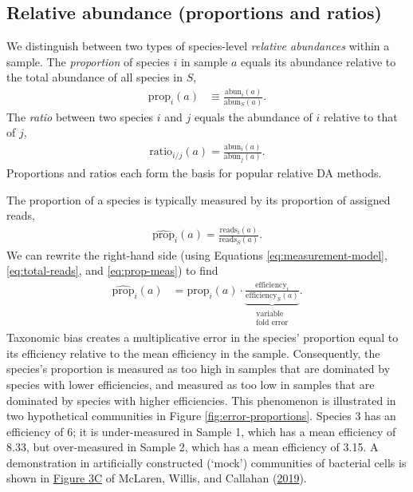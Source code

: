 \documentclass[
]{article}
\begin{document}
\hypertarget{relative-abundance}{%
\subsection{Relative abundance (proportions and ratios)}\label{relative-abundance}}

We distinguish between two types of species-level \emph{relative abundances} within a sample.
The \emph{proportion} of species \(i\) in sample \(a\) equals its abundance relative to the total abundance of all species in \(S\),
\begin{align}
  \label{eq:prop}
  \text{prop}_{i}(a) 
    &\equiv \frac{\text{abun}_i(a)}{\text{abun}_S(a)}.
\end{align}
The \emph{ratio} between two species \(i\) and \(j\) equals the abundance of \(i\) relative to that of \(j\),
\begin{align}
  \label{eq:ratio}
  \text{ratio}_{i/j}(a) = \frac{\text{abun}_i(a)}{\text{abun}_j(a)}.
\end{align}
Proportions and ratios each form the basis for popular relative DA methods.

The proportion of a species is typically measured by its proportion of assigned reads,
\begin{align}
  \label{eq:prop-meas}
  \widehat{\text{prop}}_{i}(a) = \frac{\text{reads}_i(a)}{\text{reads}_S(a)}.
\end{align}
We can rewrite the right-hand side (using Equations \eqref{eq:measurement-model}, \eqref{eq:total-reads}, and \eqref{eq:prop-meas}) to find
\begin{align}
  \label{eq:prop-error}
  \widehat{\text{prop}}_{i}(a)
  &= \text{prop}_{i}(a) \cdot \underbrace{\frac{\text{efficiency}_{i}}{\text{efficiency}_S(a)}}_{\substack{\text{variable} \\ \text{fold error}}}.
\end{align}
Taxonomic bias creates a multiplicative error in the species' proportion equal to its efficiency relative to the mean efficiency in the sample.
Consequently, the species's proportion is measured as too high in samples that are dominated by species with lower efficiencies, and measured as too low in samples that are dominated by species with higher efficiencies.
This phenomenon is illustrated in two hypothetical communities in Figure \ref{fig:error-proportions}.
Species 3 has an efficiency of 6; it is under-measured in Sample 1, which has a mean efficiency of 8.33, but over-measured in Sample 2, which has a mean efficiency of 3.15.
A demonstration in artificially constructed (`mock') communities of bacterial cells is shown in \href{https://doi.org/10.7554/eLife.46923.004}{Figure 3C} of McLaren, Willis, and Callahan (\protect\hyperlink{ref-mclaren2019cons}{2019}).
\end{document}

